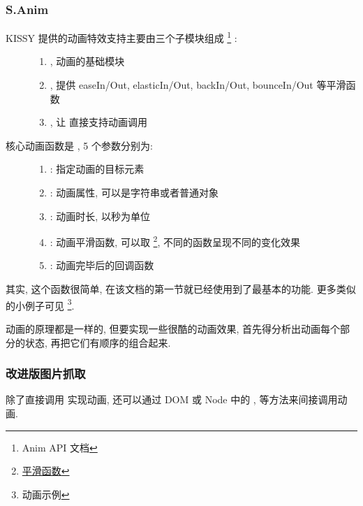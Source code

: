 \documentclass[letterpaper,10pt,english]{sphinxmanual}
\begin{document}
\subsubsection{S.Anim}
\label{quickstart/anim:s-anim}\begin{description}
\item[{KISSY 提供的动画特效支持主要由三个子模块组成 \footnote{
Anim API 文档
} :}] \leavevmode\begin{enumerate}
\item {}
, 动画的基础模块

\item {}
, 提供 easeIn/Out, elasticIn/Out, backIn/Out, bounceIn/Out 等平滑函数

\item {}
, 让  直接支持动画调用

\end{enumerate}

\item[{核心动画函数是 {\hyperref[api/core/anim/index:Anim.Anim]{}} , 5 个参数分别为:}] \leavevmode\begin{enumerate}
\item {}
: 指定动画的目标元素

\item {}
: 动画属性, 可以是字符串或者普通对象

\item {}
: 动画时长, 以秒为单位

\item {}
: 动画平滑函数, 可以取 \footnote{
\href{http://kissyteam.github.com/kissy/docs/anim/anim-easing.html}{平滑函数}
}, 不同的函数呈现不同的变化效果

\item {}
: 动画完毕后的回调函数

\end{enumerate}

\end{description}

其实, 这个函数很简单, 在该文档的第一节就已经使用到了最基本的功能. 更多类似的小例子可见 \footnote{
动画示例
}.

动画的原理都是一样的, 但要实现一些很酷的动画效果, 首先得分析出动画每个部分的状态, 再把它们有顺序的组合起来.


\subsubsection{改进版图片抓取}
\label{quickstart/anim:id4}
除了直接调用  实现动画, 还可以通过 DOM 或 Node 中的 ,  等方法来间接调用动画.
\end{document}
